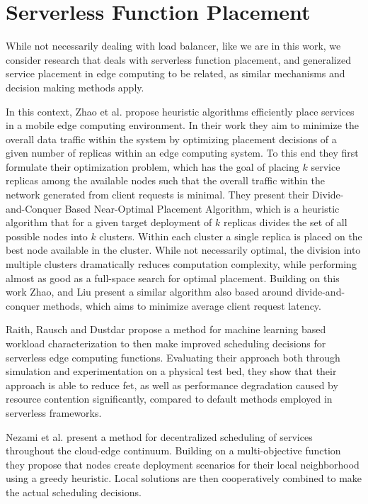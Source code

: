 \section{Serverless Function Placement}
While not necessarily dealing with load balancer, like we are in this work, we consider research that deals with serverless function placement, and generalized service placement in edge computing to be related, as similar mechanisms and decision making methods apply.

In this context, Zhao et al. \cite{zhaoOptimalPlacementVirtual2017} propose heuristic algorithms efficiently place services in a mobile edge computing environment.
In their work they aim to minimize the overall data traffic within the system by optimizing placement decisions of a given number of replicas within an edge computing system.
To this end they first formulate their optimization problem, which has the goal of placing $k$ service replicas among the available nodes such that the overall traffic within the network generated from client requests is minimal.
They present their Divide-and-Conquer Based Near-Optimal Placement Algorithm\cite{zhaoOptimalPlacementVirtual2017}, which is a heuristic algorithm that for a given target deployment of $k$ replicas divides the set of all possible nodes into $k$ clusters.
Within each cluster a single replica is placed on the best node available in the cluster.
While not necessarily optimal, the division into multiple clusters dramatically reduces computation complexity, while performing almost as good as a full-space search for optimal placement.
Building on this work Zhao, and Liu\cite{zhaoOptimalPlacementVirtual2018} present a similar algorithm also based around divide-and-conquer methods, which aims to minimize average client request latency.

Raith, Rausch and Dustdar\cite{philipp-da} propose a method for machine learning based workload characterization to then make improved scheduling decisions for serverless edge computing functions.
Evaluating their approach both through simulation and experimentation on a physical test bed, they show that their approach is able to reduce \gls{fet}, as well as performance degradation caused by resource contention significantly, compared to default methods employed in serverless frameworks\cite{philipp-da}.

Nezami et al.\cite{nezamiDecentralizedEdgetoCloudLoad2021} present a method for decentralized scheduling of services throughout the cloud-edge continuum.
Building on a multi-objective function they propose that nodes create deployment scenarios for their local neighborhood using a greedy heuristic.
Local solutions are then cooperatively combined to make the actual scheduling decisions.

